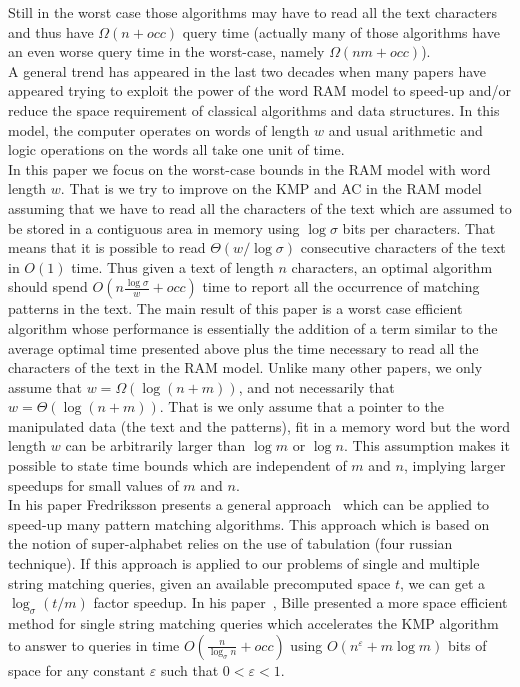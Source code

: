 \documentclass{article}
\newcommand{\?}{\mskip1.5mu}
\newcommand{\A}{\mathscr A}
\renewcommand{\epsilon}{\varepsilon}
\begin{document}
Still in the worst case those algorithms may have to read all the text characters and thus have $\Omega(n+occ)$ query time (actually many of those algorithms have an even worse query time in the worst-case, namely $\Omega(nm+occ)$).  
\\A general trend has appeared in the last two decades when many papers have appeared trying to exploit the power of the word RAM model to speed-up and/or reduce the space requirement of classical algorithms and data structures. In this model, the computer operates on words of length $w$ and usual arithmetic and logic operations on the words all take one unit of time. 
\\
In this paper we focus on the worst-case bounds in the RAM model with word length $w$. That is we try to improve on the KMP and AC in the RAM model assuming that we have to read all the characters of the text which are assumed to be stored in a contiguous area in memory using $\log\sigma$ bits per characters. That means that it is possible to read $\Theta(w/\log\sigma)$ consecutive characters of the text in $O(1)$ time. Thus given a text of length $n$ characters, an optimal algorithm should spend $O(n\frac{\log\sigma}{w}+occ)$ time to report all the occurrence of matching patterns in the text. The main result of this paper is a worst case efficient algorithm whose performance is essentially the addition of a term similar to the average optimal time presented above
plus the time necessary to read all the characters of the text in the RAM model. Unlike many other papers, we only assume that $w=\Omega(\log(n+m))$, and not necessarily that $w=\Theta(\log(n+m))$. That is we only assume that a pointer to the manipulated data (the text and the patterns), fit in a memory word but the word length $w$ can be arbitrarily larger than $\log m$ or $\log n$. This assumption makes it possible to state time bounds which are independent of $m$ and $n$, implying larger speedups for small values of $m$ and $n$. 
\\
In his paper Fredriksson presents a general approach~\cite{F02} which can be applied to speed-up many pattern matching algorithms. This approach which is based on the notion of super-alphabet relies on the use of tabulation (four russian technique). If this approach is applied to our problems of single and multiple string matching queries, given an available precomputed space $t$, we can get a $\log_\sigma (t/m)$ factor speedup. 
In his paper~\cite{B09}, Bille presented a more space efficient method for single string matching queries which accelerates the KMP algorithm to answer to queries in time $O(\frac{n}{\log_\sigma n}+occ)$ using $O(n^{\epsilon}+m\log m)$ bits of space for any constant $\epsilon$ such that $0<\epsilon<1$. 
\end{document}
